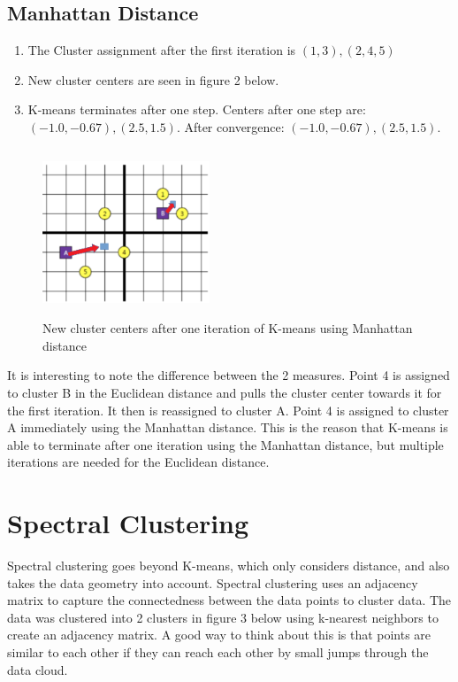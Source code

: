 \documentclass[a4paper]{article}
\begin{document}
\subsection{Manhattan Distance}

\begin{enumerate}[label=(\alph*)]
\item The Cluster assignment after the first iteration is $(1,3), (2,4,5)$
\item New cluster centers are seen in figure 2 below.
\item K-means terminates after one step.  Centers after one step are: $(-1.0, -0.67), (2.5, 1.5)$.  After convergence: $(-1.0, -0.67), (2.5, 1.5)$.
\end{enumerate}

\begin{figure}[h]
\includegraphics[width=5cm, height=5cm]{Q1_manhattan.png}
\caption{New cluster centers after one iteration of K-means using Manhattan distance}
\end{figure}


It is interesting to note the difference between the 2 measures.  Point 4 is assigned to cluster B in the Euclidean distance and pulls the cluster center towards it for the first iteration.  It then is reassigned to cluster A.  Point 4 is assigned to cluster A immediately using the Manhattan distance.  This is the reason that K-means is able to terminate after one iteration using the Manhattan distance, but multiple iterations are needed for the Euclidean distance.

\section{Spectral Clustering}

Spectral clustering goes beyond K-means, which only considers distance, and also takes the data geometry into account.  Spectral clustering uses an adjacency matrix to capture the connectedness between the data points to cluster data.  The data was clustered into 2 clusters in figure 3 below using k-nearest neighbors to create an adjacency matrix. A good way to think about this is that points are similar to each other if they can reach each other by small jumps through the data cloud.
\end{document}
